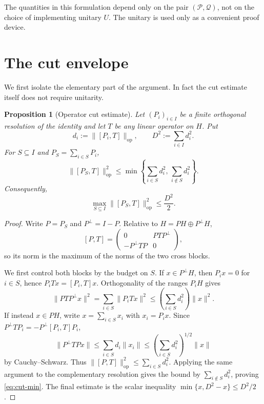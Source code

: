\documentclass[11pt]{article}
\newtheorem{proposition}[theorem]{Proposition}
\newcommand{\op}{\mathrm{op}}
\begin{document}
The quantities in this formulation depend only on the pair
$(\mathcal P,\mathcal Q)$, not on the choice of implementing unitary $U$.
The unitary is used only as a convenient proof device.

\section{The cut envelope}\label{sec:envelope}

We first isolate the elementary part of the argument.  In fact the cut
estimate itself does not require unitarity.

\begin{proposition}[Operator cut estimate]\label{prop:operator-envelope}
Let $(P_i)_{i\in I}$ be a finite orthogonal resolution of the identity and
let $T$ be any linear operator on $H$.  Put
\[
  d_i:=\|[P_i,T]\|_{\op},
  \qquad
  D^2:=\sum_{i\in I}d_i^2.
\]
For $S\subseteq I$ and $P_S=\sum_{i\in S}P_i$,
\begin{equation}\label{eq:cut-min}
  \|[P_S,T]\|_{\op}^2
  \le
  \min\left\{
    \sum_{i\in S}d_i^2,\,
    \sum_{i\notin S}d_i^2
  \right\}.
\end{equation}
Consequently,
\[
  \max_{S\subseteq I}\|[P_S,T]\|_{\op}^2
  \le\frac{D^2}{2}.
\]
\end{proposition}

\begin{proof}
Write $P=P_S$ and $P^\perp=I-P$.  Relative to
$H=PH\oplus P^\perp H$,
\[
  [P,T]
  =
  \begin{pmatrix}
    0 & PTP^\perp\\
    -P^\perp TP & 0
  \end{pmatrix},
\]
so its norm is the maximum of the norms of the two cross blocks.

We first control both blocks by the budget on $S$.  If
$x\in P^\perp H$, then $P_i x=0$ for $i\in S$, hence
$P_iTx=[P_i,T]x$.  Orthogonality of the ranges $P_iH$ gives
\[
  \|PTP^\perp x\|^2
  =
  \sum_{i\in S}\|P_iTx\|^2
  \le
  \left(\sum_{i\in S}d_i^2\right)\|x\|^2.
\]
If instead $x\in PH$, write $x=\sum_{i\in S}x_i$ with
$x_i=P_i x$.  Since
$P^\perp TP_i=-P^\perp[P_i,T]P_i$,
\[
  \|P^\perp TPx\|
  \le
  \sum_{i\in S}d_i\|x_i\|
  \le
  \left(\sum_{i\in S}d_i^2\right)^{1/2}\|x\|
\]
by Cauchy--Schwarz.  Thus
$\|[P,T]\|_{\op}^2\le\sum_{i\in S}d_i^2$.
Applying the same argument to the complementary resolution gives the bound by
$\sum_{i\notin S}d_i^2$, proving \eqref{eq:cut-min}.  The final estimate is
the scalar inequality $\min\{x,D^2-x\}\le D^2/2$.
\end{proof}
\end{document}
